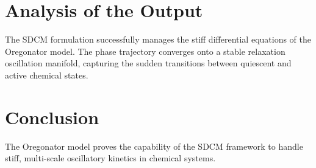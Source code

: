\section{Analysis of the Output}
The SDCM formulation successfully manages the stiff differential equations of the Oregonator model. The phase trajectory converges onto a stable relaxation oscillation manifold, capturing the sudden transitions between quiescent and active chemical states.

\section{Conclusion}
The Oregonator model proves the capability of the SDCM framework to handle stiff, multi-scale oscillatory kinetics in chemical systems.
